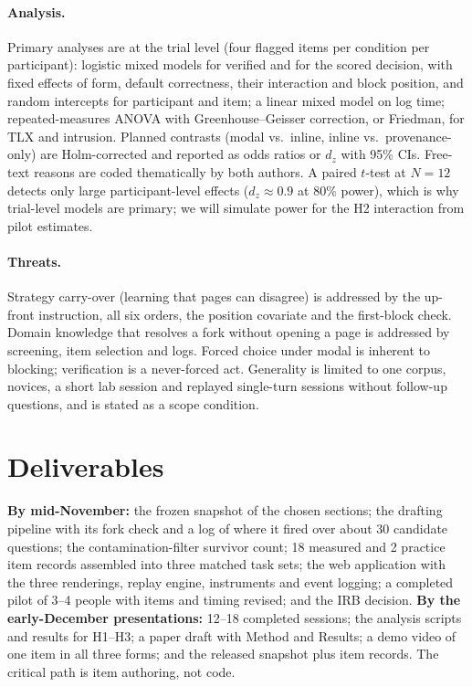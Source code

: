 \documentclass[sigconf,nonacm]{acmart}
\begin{document}
\paragraph{Analysis.}
Primary analyses are at the trial level (four flagged items per condition
per participant): logistic mixed models for verified and for the scored
decision, with fixed effects of form, default correctness, their
interaction and block position, and random intercepts for participant and
item; a linear mixed model on log time; repeated-measures ANOVA with
Greenhouse--Geisser correction, or Friedman, for TLX and intrusion.
Planned contrasts (modal vs.\ inline, inline vs.\ provenance-only) are
Holm-corrected and reported as odds ratios or $d_z$ with 95\% CIs.
Free-text reasons are coded thematically by both authors. A paired
$t$-test at $N{=}12$ detects only large participant-level effects ($d_z
\approx 0.9$ at 80\% power), which is why trial-level models are primary;
we will simulate power for the H2 interaction from pilot estimates.

\paragraph{Threats.}
Strategy carry-over (learning that pages can disagree) is addressed by the
up-front instruction, all six orders, the position covariate and the
first-block check. Domain knowledge that resolves a fork without opening a
page is addressed by screening, item selection and logs. Forced choice
under modal is inherent to blocking; verification is a never-forced act.
Generality is limited to one corpus, novices, a short lab session and
replayed single-turn sessions without follow-up questions, and is stated
as a scope condition.

\section{Deliverables}
\label{sec:deliverables}

\textbf{By mid-November:} the frozen snapshot of the chosen sections; the
drafting pipeline with its fork check and a log of where it fired over
about 30 candidate questions; the contamination-filter survivor count; 18
measured and 2 practice item records assembled into three matched task
sets; the web application with the three renderings, replay engine,
instruments and event logging; a completed pilot of 3--4 people with items
and timing revised; and the IRB decision. \textbf{By the early-December
presentations:} 12--18 completed sessions; the analysis scripts and
results for H1--H3; a paper draft with Method and Results; a demo video of
one item in all three forms; and the released snapshot plus item records.
The critical path is item authoring, not code.
\end{document}
